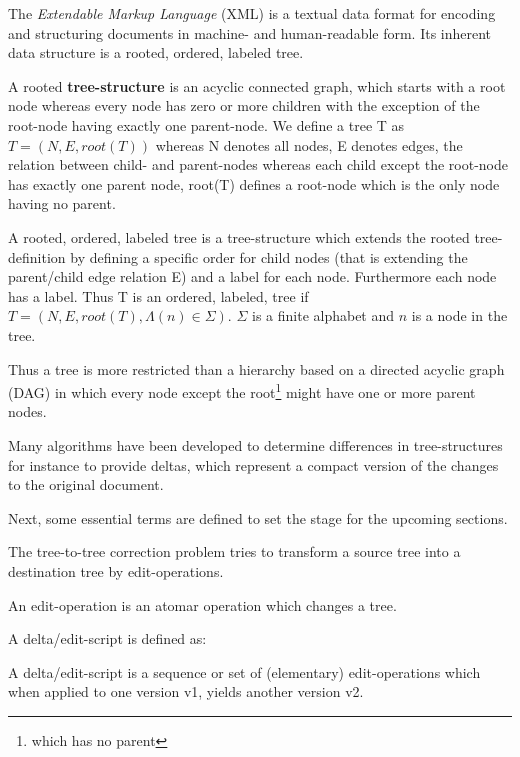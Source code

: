 The \emph{Extendable Markup Language} (XML) is a textual data format for encoding and structuring documents in machine- and human-readable form. Its inherent data structure is a rooted, ordered, labeled tree. 

\begin{mydef}
A rooted \textbf{tree-structure} is an acyclic connected graph, which starts with a root node whereas every node has zero or more children with the exception of the root-node having exactly one parent-node. We define a tree T as $T = (N, E, root(T))$ whereas N denotes all nodes, E denotes edges, the relation between child- and parent-nodes whereas each child except the root-node has exactly one parent node, root(T) defines a root-node which is the only node having no parent.
\end{mydef}

\begin{mydef}
A rooted, ordered, labeled tree is a tree-structure which extends the rooted tree-definition by defining a specific order for child nodes (that is extending the parent/child edge relation E) and a label for each node. Furthermore each node has a label. Thus T is an ordered, labeled, tree if $T = (N, E, root(T), \Lambda(n) \in \Sigma)$. $\Sigma$ is a finite alphabet and $n$ is a node in the tree.
\end{mydef}

Thus a tree is more restricted than a hierarchy based on a directed acyclic graph (DAG) in which every node except the root\footnote{which has no parent} might have one or more parent nodes.

Many algorithms have been developed to determine differences in tree-structures for instance to provide deltas, which represent a compact version of the changes to the original document.

Next, some essential terms are defined to set the stage for the upcoming sections.

The tree-to-tree correction problem tries to transform a source tree into a destination tree by edit-operations. 

\begin{mydef}
An edit-operation is an atomar operation which changes a tree.
\end{mydef}

A delta/edit-script is defined as:

\begin{mydef}
A delta/edit-script is a sequence or set of (elementary) edit-operations which when applied to one version v1, yields another version v2.
\end{mydef}


